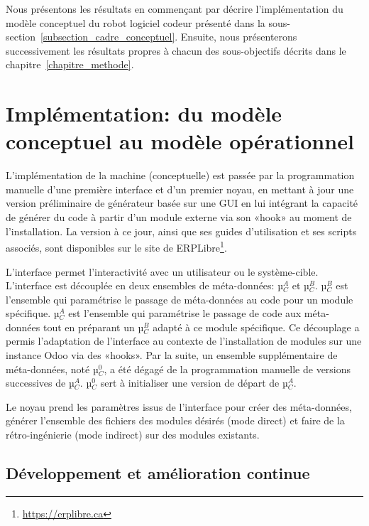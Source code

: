 \label{sec:Theme2}
Nous présentons les résultats en commençant par décrire l’implémentation du modèle conceptuel du robot logiciel codeur présenté dans la sous-section~\ref{subsection_cadre_conceptuel}. Ensuite, nous présenterons successivement les résultats propres à chacun des sous-objectifs décrits dans le chapitre~\ref{chapitre_methode}.

\section{Implémentation: du modèle conceptuel au modèle opérationnel}

L’implémentation de la machine (conceptuelle) est passée par la programmation manuelle d’une première interface et d’un premier noyau, en mettant à jour une version préliminaire de générateur basée sur une GUI\cite{bluiksnot_repo} en lui intégrant la capacité de générer du code à partir d’un module externe via son «hook» au moment de l’installation. La version à ce jour, ainsi que ses guides d’utilisation et ses scripts associés, sont disponibles sur le site de ERPLibre\footnote{\url{https://erplibre.ca}}.

L’interface permet l’interactivité avec un utilisateur ou le système-cible. L’interface est découplée en deux ensembles de méta-données: µ$_C^A$ et µ$_C^B$. µ$_C^B$ est l’ensemble qui paramétrise le passage de méta-données au code pour un module spécifique. µ$_C^A$ est l’ensemble qui paramétrise le passage de code aux méta-données tout en préparant un µ$_C^B$ adapté à ce module spécifique. Ce découplage a permis l’adaptation de l’interface au contexte de l’installation de modules sur une instance Odoo via des «hooks». Par la suite, un ensemble supplémentaire de méta-données, noté µ$_C^0$, a été dégagé de la programmation manuelle de versions successives de µ$_C^A$. µ$_C^0$ sert à initialiser une version de départ de µ$_C^A$.

Le noyau prend les paramètres issus de l’interface pour créer des méta-données, générer l’ensemble des fichiers des modules désirés (mode direct) et faire de la rétro-ingénierie (mode indirect) sur des modules existants.

\subsection{Développement et amélioration continue}

